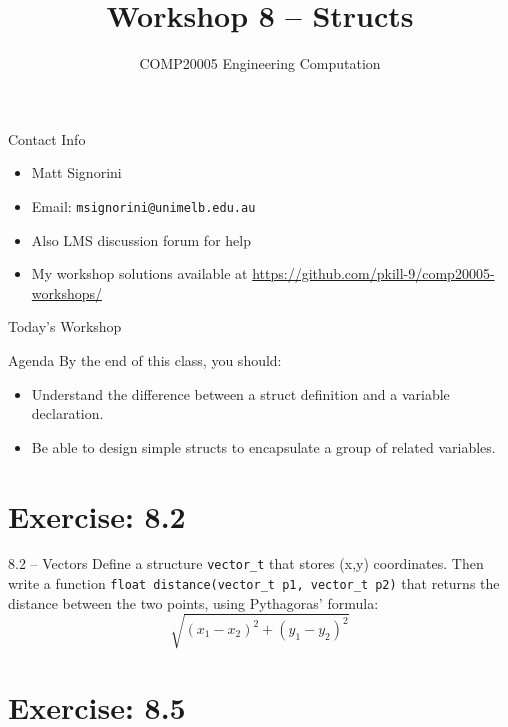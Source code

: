 \documentclass{beamer}
\title{Workshop 8 -- Structs}
\author{COMP20005 Engineering Computation}
\institute{The University of Melbourne}
\begin{document}
\renewcommand{\tt}[1]{\texttt{#1}}

\begin{frame}
    \titlepage
\end{frame}

\begin{frame}{Contact Info}
    \begin{itemize}
        \item Matt Signorini
        \item Email: \tt{msignorini@unimelb.edu.au}
        \item Also LMS discussion forum for help
        \item My workshop solutions available at \url{https://github.com/pkill-9/comp20005-workshops/}
    \end{itemize}
\end{frame}

\begin{frame}{Today's Workshop}
    \begin{block}{Agenda}
        By the end of this class, you should:
        \begin{itemize}
            \item Understand the difference between a struct definition
                and a variable declaration.
            \item Be able to design simple structs to encapsulate a group
                of related variables.
        \end{itemize}
    \end{block}
\end{frame}

\section{Exercise: 8.2}

\begin{frame}{8.2 -- Vectors}
    Define a structure \tt{vector\_t} that stores (x,y) coordinates.
    Then write a function \tt{float distance(vector\_t p1, vector\_t p2)}
    that returns the distance between the two points, using Pythagoras'
    formula:
    \begin{equation}
        \sqrt{(x_1 - x_2)^2 + (y_1 - y_2)^2}
    \end{equation}
\end{frame}

\section{Exercise: 8.5}
\end{document}
